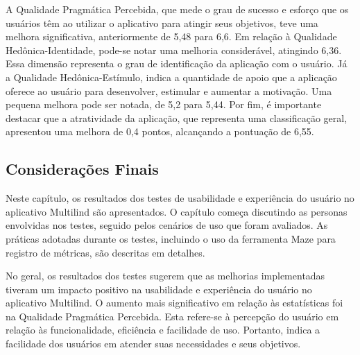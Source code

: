 A Qualidade Pragmática Percebida, que mede o grau de sucesso e esforço que os usuários têm ao utilizar o aplicativo para atingir seus objetivos, teve uma melhora significativa, anteriormente de 5,48 para 6,6. Em relação à 
Qualidade Hedônica-Identidade, pode-se notar uma melhoria considerável, atingindo 6,36. Essa dimensão representa o grau de identificação da aplicação com o usuário. Já a Qualidade Hedônica-Estímulo, indica a quantidade de apoio que a aplicação oferece ao usuário 
para desenvolver, estimular e aumentar a motivação. Uma pequena melhora pode ser notada, de 5,2 para 5,44. Por fim, é importante destacar que a atratividade da aplicação, que representa uma classificação geral, apresentou uma melhora de 0,4 pontos, alcançando a 
pontuação de 6,55.

\subsection{Considerações Finais}
\label{sec:Considerações Finais}
Neste capítulo, os resultados dos testes de usabilidade e experiência do usuário no aplicativo Multilind são apresentados. O capítulo começa discutindo as personas envolvidas nos testes, seguido pelos cenários de uso que foram avaliados. As práticas adotadas durante os testes, incluindo 
o uso da ferramenta Maze para registro de métricas, são descritas em detalhes.

No geral, os resultados dos testes sugerem que as melhorias implementadas tiveram um impacto positivo na usabilidade e experiência do usuário no aplicativo Multilind. O aumento mais significativo em relação às estatísticas foi na Qualidade Pragmática Percebida. Esta refere-se à percepção 
do usuário em relação às funcionalidade, eficiência e facilidade de uso. Portanto, indica a facilidade dos usuários em atender suas necessidades e seus objetivos.